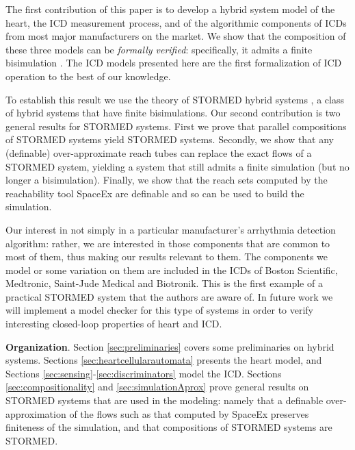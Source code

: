 The first contribution of this paper is to develop a hybrid system model of the heart, the \ac{ICD} measurement process, and of the algorithmic components of \acp{ICD} from most major manufacturers on the market.
We show that the composition of these three models can be \emph{formally verified}: specifically, it admits a finite bisimulation \cite{AlurHLP00ieee}.
The \ac{ICD} models presented here are the first formalization of \ac{ICD} operation to the best of our knowledge.

To establish this result we use the theory of STORMED hybrid systems \cite{VladimerouPVD08_STORMED}, a class of hybrid systems that have finite bisimulations.
Our second contribution is two general results for STORMED systems.
First we prove that parallel compositions of STORMED systems yield STORMED systems.
Secondly, we show that any (definable) over-approximate reach tubes can replace the exact flows of a STORMED system, yielding a system that still admits a finite simulation (but no longer a bisimulation). 
Finally, we show that the reach sets computed by the reachability tool SpaceEx \cite{FrehseCAV11} are definable and so can be used to build the simulation.


Our interest in not simply in a particular manufacturer's arrhythmia detection algorithm: rather, we are interested in those components that are common to most of them, thus making our results relevant to them.
The components we model or some variation on them are included in the \acp{ICD} of Boston Scientific, Medtronic, Saint-Jude Medical and Biotronik.
This is the first example of a practical STORMED system that the authors are aware of.
In future work we will implement a model checker for this type of systems in order to verify interesting closed-loop properties of heart and \ac{ICD}.

\textbf{Organization}. 
Section \ref{sec:preliminaries} covers some preliminaries on hybrid systems.
Sections \ref{sec:heartcellularautomata} presents the heart model,
and Sections \ref{sec:sensing}-\ref{sec:discriminators} model the \ac{ICD}.
Sections \ref{sec:compositionality} and \ref{sec:simulationAprox} prove general results on STORMED systems that are used in the modeling: namely that a definable over-approximation of the flows such as that computed by SpaceEx preserves finiteness of the simulation, and that compositions of STORMED systems are STORMED.

